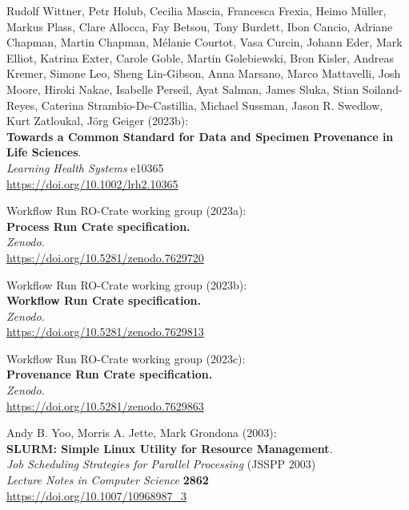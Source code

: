 \documentclass[10pt,letterpaper]{article}
\begin{document}
\begin{thebibliography}{10}
\begin{small}
Rudolf Wittner, Petr Holub, Cecilia Mascia, Francesca Frexia, Heimo Müller, Markus Plass, Clare Allocca, Fay Betsou, Tony Burdett, Ibon Cancio, Adriane Chapman, Martin Chapman, Mélanie Courtot, Vasa Curcin, Johann Eder, Mark Elliot, Katrina Exter, Carole Goble, Martin Golebiewski, Bron Kisler, Andreas Kremer, Simone Leo, Sheng Lin-Gibson, Anna Marsano, Marco Mattavelli, Josh Moore, Hiroki Nakae, Isabelle Perseil, Ayat Salman, James Sluka, Stian Soiland-Reyes, Caterina Strambio-De-Castillia, Michael Sussman, Jason R. Swedlow, Kurt Zatloukal, Jörg Geiger (2023b):\\
\textbf{Towards a Common Standard for Data and Specimen Provenance in
Life Sciences}.\\
\emph{Learning Health Systems} e10365\\
\url{https://doi.org/10.1002/lrh2.10365}


 Workflow Run RO-Crate working group (2023a):\\
\textbf{Process Run Crate specification.}\\
\emph{Zenodo}.\\
\url{https://doi.org/10.5281/zenodo.7629720}

 Workflow Run RO-Crate working group (2023b):\\
\textbf{Workflow Run Crate specification.}\\
\emph{Zenodo}.\\
\url{https://doi.org/10.5281/zenodo.7629813}

 Workflow Run RO-Crate working group (2023c):\\
\textbf{Provenance Run Crate specification.}\\
\emph{Zenodo}.\\
\url{https://doi.org/10.5281/zenodo.7629863}

Andy B. Yoo, Morris A. Jette, Mark Grondona (2003):\\
\textbf{SLURM: Simple Linux Utility for Resource Management}.\\
\emph{Job Scheduling Strategies for Parallel Processing} (JSSPP 2003)\\
\emph{Lecture Notes in Computer Science} \textbf{2862}\\
\url{https://doi.org/10.1007/10968987_3}

\end{small}


\end{thebibliography}
\end{document}
